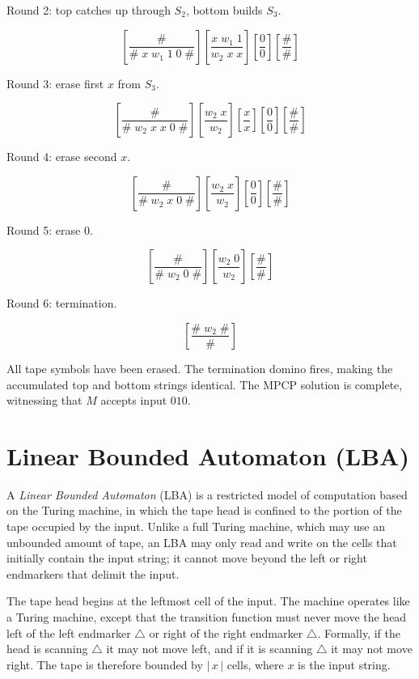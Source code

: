 \documentclass[12pt,a4paper,openany]{article}
\begin{document}
\begin{enumerate}
    Round 2: top catches up through $S_2$, bottom builds $S_3$.
    
    \[
    \left[\frac{\#}{\#\;x\;w_1\;1\;0\;\#}\right]
    \left[\frac{x\;w_1\;1}{w_2\;x\;x}\right]
    \left[\frac{0}{0}\right]
    \left[\frac{\#}{\#}\right]
    \]

   Round 3: erase first $x$ from $S_3$.
    
    \[
    \left[\frac{\#}{\#\;w_2\;x\;x\;0\;\#}\right]
    \left[\frac{w_2\;x}{w_2}\right]
    \left[\frac{x}{x}\right]
    \left[\frac{0}{0}\right]
    \left[\frac{\#}{\#}\right]
    \]

    Round 4: erase second $x$.
    
    \[
    \left[\frac{\#}{\#\;w_2\;x\;0\;\#}\right]
    \left[\frac{w_2\;x}{w_2}\right]
    \left[\frac{0}{0}\right]
    \left[\frac{\#}{\#}\right]
    \]

    Round 5: erase $0$.
    
    \[
    \left[\frac{\#}{\#\;w_2\;0\;\#}\right]
    \left[\frac{w_2\;0}{w_2}\right]
    \left[\frac{\#}{\#}\right]
    \]

    Round 6: termination.
    
    \[
    \left[\frac{\#\;w_2\;\#}{\#}\right]
    \]

\end{enumerate}

All tape symbols have been erased. The termination domino fires, making the accumulated
top and bottom strings identical. The MPCP solution is complete, witnessing that $M$
accepts input $010$.

\section{Linear Bounded Automaton (LBA)}

A \emph{Linear Bounded Automaton} (LBA) is a restricted model of computation based on the
Turing machine, in which the tape head is confined to the portion of the tape occupied by the
input. Unlike a full Turing machine, which may use an unbounded amount of tape, an LBA may
only read and write on the cells that initially contain the input string; it cannot move beyond
the left or right endmarkers that delimit the input.

The tape head begins at the leftmost cell of the input. The machine operates like a Turing
machine, except that the transition function must never move the head left of the left endmarker
$\triangle$ or right of the right endmarker $\triangle$. Formally, if the head is scanning
$\triangle$ it may not move left, and if it is scanning $\triangle$ it may not move right.
The tape is therefore bounded by $|\,x\,|$ cells, where $x$ is the input string.
\end{document}
